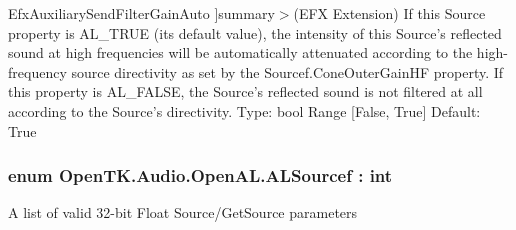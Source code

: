 \begin{Desc}
\begin{description}
{\hypertarget{namespace_open_t_k_1_1_audio_1_1_open_a_l_ab6ee1a1f6b513b5681a01359b8aaf3c3a4240cc97f0fe8102e816f6a5040810d1}{Efx\-Auxiliary\-Send\-Filter\-Gain\-Auto}\label{namespace_open_t_k_1_1_audio_1_1_open_a_l_ab6ee1a1f6b513b5681a01359b8aaf3c3a4240cc97f0fe8102e816f6a5040810d1}
}]summary$>$(E\-F\-X Extension) If this Source property is A\-L\-\_\-\-T\-R\-U\-E (its default value), the intensity of this Source’s reflected sound at high frequencies will be automatically attenuated according to the high-\/frequency source directivity as set by the Sourcef.\-Cone\-Outer\-Gain\-H\-F property. If this property is A\-L\-\_\-\-F\-A\-L\-S\-E, the Source’s reflected sound is not filtered at all according to the Source’s directivity. Type\-: bool Range \mbox{[}False, True\mbox{]} Default\-: True\end{description}
\end{Desc}
\hypertarget{namespace_open_t_k_1_1_audio_1_1_open_a_l_a04d9b7aaf9c70a9e06f053b2d98f5c46}{
\subsubsection[{A\-L\-Sourcef}]{\setlength{\rightskip}{0pt plus 5cm}enum {\bf Open\-T\-K.\-Audio.\-Open\-A\-L.\-A\-L\-Sourcef} \-: int}}\label{namespace_open_t_k_1_1_audio_1_1_open_a_l_a04d9b7aaf9c70a9e06f053b2d98f5c46}


A list of valid 32-\/bit Float Source/\-Get\-Source parameters

